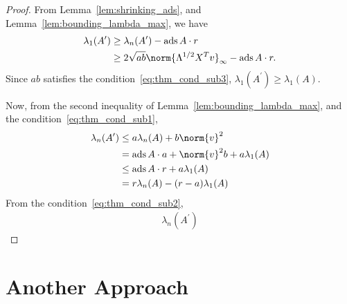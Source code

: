 \documentclass[nobib]{my-handout}
\theoremstyle{definition}
\theoremstyle{remark}
\DeclareMathOperator{\ads}{ads}
\begin{document}
\begin{proof}
	From Lemma~\ref{lem:shrinking_ads}, and Lemma~\ref{lem:bounding_lambda_max},
	we have
	\begin{align*}
		\lambda_1(A^\prime)
		&\ge \lambda_n(A^\prime) - \ads{A} \cdot r \\
		&\ge 2 \sqrt{a b} \norm{\Lambda^{1/2} X^T v}_{\infty} - \ads{A} \cdot r.
	\end{align*}
	Since $ab$ satisfies the condition~\eqref{eq:thm_cond_sub3}, 
	$\lambda_1(A^\prime) \ge \lambda_1(A). \label{eq:min_eig_inequality}$

	Now, from the second inequality of Lemma~\eqref{lem:bounding_lambda_max}, and
	the condition~\eqref{eq:thm_cond_sub1},
	\begin{equation*}
		\begin{aligned}
			\lambda_n(A^\prime)
			&\le a \lambda_n(A) + b \norm{v}^2 \\
			&= \ads{A} \cdot a + \norm{v}^2 b + a \lambda_1(A) \\
			&\le \ads{A} \cdot r + a \lambda_1(A) \\
			&= r \lambda_n(A) - (r - a) \lambda_1(A)
		\end{aligned}
	\end{equation*}
	From the condition~\eqref{eq:thm_cond_sub2},
	\begin{align*}
		\lambda_n(A^\prime)
	\end{align*}
\end{proof}


\section{Another Approach}
\end{document}
